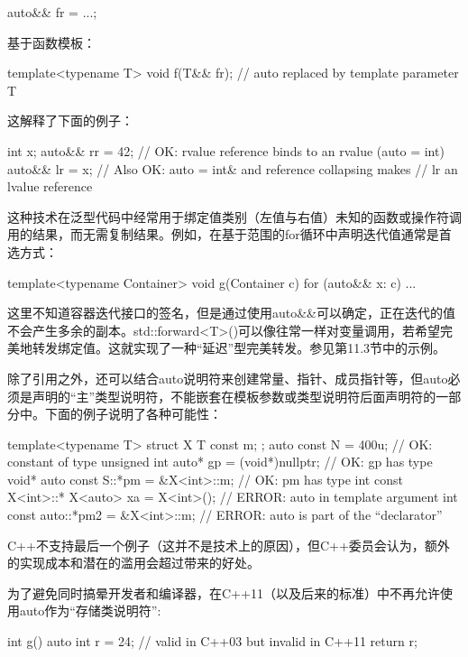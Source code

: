 \begin{cpp}
auto&& fr = ...;
\end{cpp}

基于函数模板：

\begin{cpp}
template<typename T> void f(T&& fr); // auto replaced by template parameter T
\end{cpp}

这解释了下面的例子：

\begin{cpp}
int x;
auto&& rr = 42; // OK: rvalue reference binds to an rvalue (auto = int)
auto&& lr = x; // Also OK: auto = int& and reference collapsing makes
// lr an lvalue reference
\end{cpp}

这种技术在泛型代码中经常用于绑定值类别（左值与右值）未知的函数或操作符调用的结果，而无需复制结果。例如，在基于范围的for循环中声明迭代值通常是首选方式：

\begin{cpp}
template<typename Container> void g(Container c) {
	for (auto&& x: c) {
		...
	}
}
\end{cpp}

这里不知道容器迭代接口的签名，但是通过使用auto\&\&可以确定，正在迭代的值不会产生多余的副本。std::forward<T>()可以像往常一样对变量调用，若希望完美地转发绑定值。这就实现了一种“延迟”型完美转发。参见第11.3节中的示例。

除了引用之外，还可以结合auto说明符来创建常量、指针、成员指针等，但auto必须是声明的“主”类型说明符，不能嵌套在模板参数或类型说明符后面声明符的一部分中。下面的例子说明了各种可能性：

\begin{cpp}
template<typename T> struct X { T const m; };
auto const N = 400u; // OK: constant of type unsigned int
auto* gp = (void*)nullptr; // OK: gp has type void*
auto const S::*pm = &X<int>::m; // OK: pm has type int const X<int>::*
X<auto> xa = X<int>(); // ERROR: auto in template argument
int const auto::*pm2 = &X<int>::m; // ERROR: auto is part of the “declarator”
\end{cpp}

C++不支持最后一个例子（这并不是技术上的原因），但C++委员会认为，额外的实现成本和潜在的滥用会超过带来的好处。

为了避免同时搞晕开发者和编译器，在C++11（以及后来的标准）中不再允许使用auto作为“存储类说明符”:

\begin{cpp}
int g() {
	auto int r = 24; // valid in C++03 but invalid in C++11
	return r;
}
\end{cpp}

